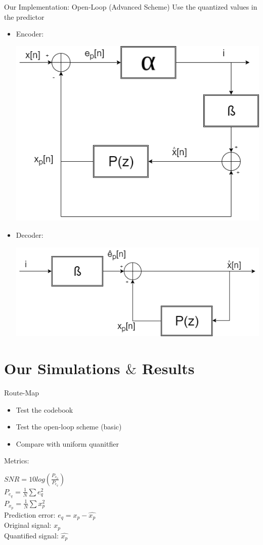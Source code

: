 \documentclass[10pt]{beamer}
\begin{document}
  \begin{frame}{Our Implementation: Open-Loop (Advanced Scheme)}
  Use the quantized values in the predictor
  \begin{itemize}
    \item Encoder:\\
      \begin{center}
      \includegraphics[width=0.45\linewidth]{./img/Esquema_3.png}
      \end{center}
    \item Decoder:\\
    \begin{center}
    \includegraphics[width=0.55\linewidth]{./img/Esquema_4.png}
    \end{center}
  \end{itemize}
  \end{frame}


  \begingroup
  \section{Our Simulations $\&$ Results}
  \endgroup

  \begin{frame}{Route-Map}
  \begin{itemize}
    \item Test the codebook
    \item Test the open-loop scheme (basic)
    \item Compare with uniform quanitfier
  \end{itemize}

  Metrics:


  \centering
    $SNR = 10log(\frac{P_{x_p}}{P_e_q})$ \\
    $P_e_q = \frac{1}{N}\sum e_q^2$\\
    $P_x_p = \frac{1}{N}\sum x_p^2$\\
    Prediction error: $e_q = x_p - \hat{x_p} $\\
    Original signal: $x_p$\\
    Quantified signal: $\hat{x_p}$\\

  \end{frame}
\end{document}
